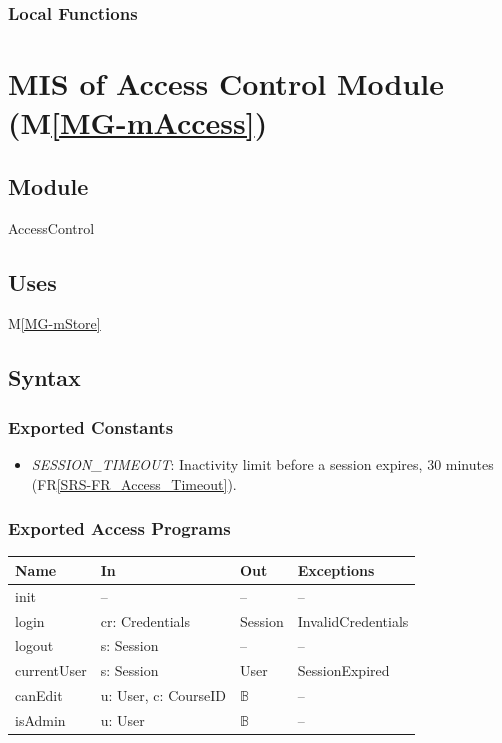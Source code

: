 \documentclass[12pt, titlepage]{article}
\newcommand{\mref}[1]{M\ref{MG-#1}}
\newcommand{\frref}[1]{FR\ref{SRS-#1}}
\begin{document}

\subsubsection{Local Functions}


\newpage

\section{MIS of Access Control Module (\mref{mAccess})} \label{mis-mAccess}

\subsection{Module}

AccessControl

\subsection{Uses}

\mref{mStore}

\subsection{Syntax}

\subsubsection{Exported Constants}

\begin{itemize}
\item \textit{SESSION\_TIMEOUT}: Inactivity limit before a session expires, 30 minutes (\frref{FR_Access_Timeout}).
\end{itemize}

\subsubsection{Exported Access Programs}

\begin{center}\small
\begin{tabular}{>{\raggedright\arraybackslash}p{3.3cm} >{\raggedright\arraybackslash}p{4.1cm} >{\raggedright\arraybackslash}p{3.4cm} >{\raggedright\arraybackslash}p{4.0cm}}
\hline
\textbf{Name} & \textbf{In} & \textbf{Out} & \textbf{Exceptions} \\
\hline
init & -- & -- & -- \\
login & cr: Credentials & Session & InvalidCredentials \\
logout & s: Session & -- & -- \\
currentUser & s: Session & User & SessionExpired \\
canEdit & u: User, c: CourseID & $\mathbb{B}$ & -- \\
isAdmin & u: User & $\mathbb{B}$ & -- \\
\hline
\end{tabular}
\end{center}
\end{document}

